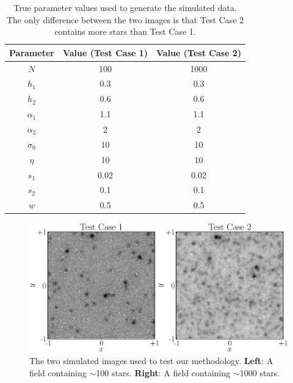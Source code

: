\documentclass[12pt, preprint]{aastex}
\begin{document}
\begin{table}[ht!]\footnotesize
\begin{center}
\begin{tabular}{|c|c|c|}
\hline
Parameter & Value (Test Case 1) & Value (Test Case 2)\\
\hline
$N$ & 100 & 1000\\
$h_1$ & 0.3 & 0.3\\
$h_2$ & 0.6 & 0.6\\
$\alpha_1$ & 1.1 & 1.1\\
$\alpha_2$ & 2 & 2\\
\hline
$\sigma_0$ & 10 & 10\\
$\eta$ & 10 & 10 \\
$s_1$ & 0.02 & 0.02\\
$s_2$ & 0.1 & 0.1\\
$w$ & 0.5 & 0.5\\
\hline
\end{tabular}
\end{center}
\caption{True parameter values used to generate the simulated data. The only
difference between the two images is that Test Case 2 contains more stars than
Test Case 1.
\label{tab:truth}}
\end{table}

\begin{figure}[ht!]
\begin{center}
\includegraphics[width=\textwidth]{Figures/test_cases.eps}
\caption{The two simulated images used to test our methodology.
{\bf Left}: A field containing $\sim$100 stars.
{\bf Right}: A field containing $\sim$1000 stars.\label{fig:simulated_data}}
\end{center}
\end{figure}
\end{document}
